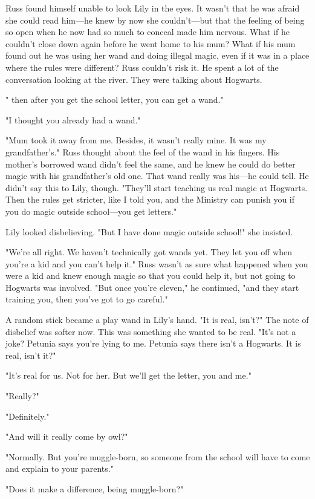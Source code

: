 Russ found himself unable to look Lily in the eyes. It wasn't that he was afraid she could read him—he knew by now she couldn't—but that the feeling of being so open when he now had so much to conceal made him nervous. What if he couldn't close down again before he went home to his mum? What if his mum found out he was using her wand and doing illegal magic, even if it was in a place where the rules were different? Russ couldn't risk it. He spent a lot of the conversation looking at the river. They were talking about Hogwarts.

"{\el} then after you get the school letter, you can get a wand."

"I thought you already had a wand."

"Mum took it away from me. Besides, it wasn't really mine. It was my grandfather's." Russ thought about the feel of the wand in his fingers. His mother's borrowed wand didn't feel the same, and he knew he could do better magic with his grandfather's old one. That wand really was his—he could tell. He didn't say this to Lily, though. "They'll start teaching us real magic at Hogwarts. Then the rules get stricter, like I told you, and the Ministry can punish you if you do magic outside school—you get letters."

Lily looked disbelieving. "But I have done magic outside school!" she insisted.

"We're all right. We haven't technically got wands yet. They let you off when you're a kid and you can't help it." Russ wasn't as sure what happened when you were a kid and knew enough magic so that you could help it, but not going to Hogwarts was involved. "But once you're eleven," he continued, "and they start training you, then you've got to go careful."

A random stick became a play wand in Lily's hand. "It is real, isn't?" The note of disbelief was softer now. This was something she wanted to be real. "It's not a joke? Petunia says you're lying to me. Petunia says there isn't a Hogwarts. It is real, isn't it?"

"It's real for us. Not for her. But we'll get the letter, you and me."

"Really?"

"Definitely."

"And will it really come by owl?"

"Normally. But you're muggle-born, so someone from the school will have to come and explain to your parents."

"Does it make a difference, being muggle-born?"


